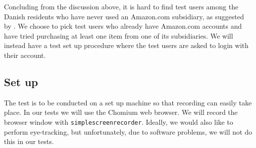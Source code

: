Concluding from the discussion above, it is hard to find test users among the
Danish residents who have never used an Amazon.com subsidiary, as suggested by
\cite{molich}. We choose to pick test users who already have Amazon.com
accounts and have tried purchasing at least one item from one of its
subsidiaries. We will instead have a test set up procedure where the test users
are asked to login with their account.

















\subsection{Set up}

The test is to be conducted on a set up machine so that recording can easily
take place. In our tests we will use the Chomium web browser. We will record
the browser window with \texttt{simplescreenrecorder}\footnotemark. Ideally, we
would also like to perform eye-tracking, but unfortunately, due to software
problems, we will not do this in our tests.

